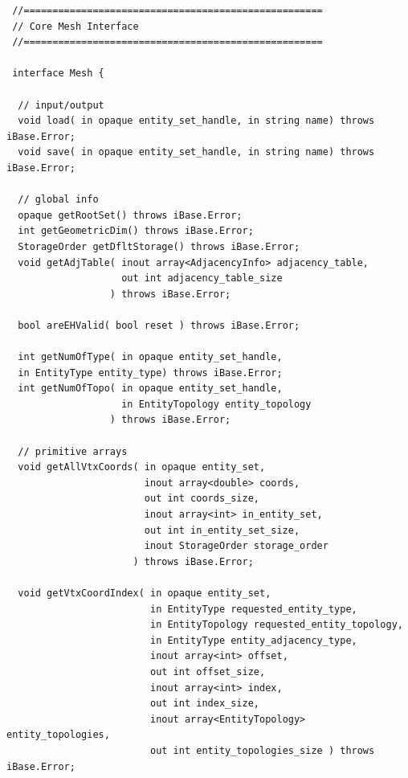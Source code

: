 \documentclass{article}
\begin{document}
\begin{small}
\begin{verbatim}
 //==================================================== 
 // Core Mesh Interface 
 //====================================================

 interface Mesh {
 
  // input/output 
  void load( in opaque entity_set_handle, in string name) throws iBase.Error; 
  void save( in opaque entity_set_handle, in string name) throws iBase.Error;

  // global info 
  opaque getRootSet() throws iBase.Error; 
  int getGeometricDim() throws iBase.Error; 
  StorageOrder getDfltStorage() throws iBase.Error; 
  void getAdjTable( inout array<AdjacencyInfo> adjacency_table,
                    out int adjacency_table_size
                  ) throws iBase.Error;

  bool areEHValid( bool reset ) throws iBase.Error; 

  int getNumOfType( in opaque entity_set_handle,  
  in EntityType entity_type) throws iBase.Error; 
  int getNumOfTopo( in opaque entity_set_handle, 
                    in EntityTopology entity_topology
                  ) throws iBase.Error;
    
  // primitive arrays 
  void getAllVtxCoords( in opaque entity_set, 
                        inout array<double> coords,   
                        out int coords_size, 
                        inout array<int> in_entity_set, 
                        out int in_entity_set_size, 
                        inout StorageOrder storage_order
                      ) throws iBase.Error;

  void getVtxCoordIndex( in opaque entity_set, 
                         in EntityType requested_entity_type,  
                         in EntityTopology requested_entity_topology, 
                         in EntityType entity_adjacency_type,  
                         inout array<int> offset, 
                         out int offset_size, 
                         inout array<int> index, 
                         out int index_size, 
                         inout array<EntityTopology> entity_topologies,  
                         out int entity_topologies_size ) throws iBase.Error;


\end{verbatim}
\end{small}
\end{document}
